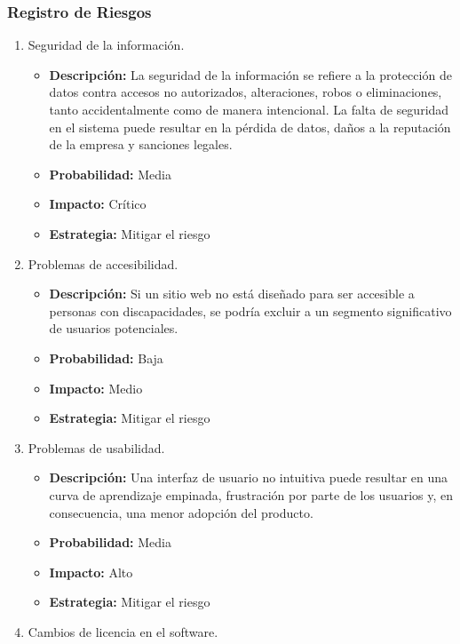 \subsubsection{Registro de Riesgos}
\begin{enumerate}
    \item Seguridad de la información.
    \begin{itemize}
        \item \textbf{Descripción:} La seguridad de la información se refiere a la protección de datos contra accesos no autorizados, 
        alteraciones, robos o eliminaciones, tanto accidentalmente como de manera intencional. 
        La falta de seguridad en el sistema puede resultar en la pérdida de datos, daños a la reputación de la empresa y sanciones legales. 
        \item \textbf{Probabilidad:} Media
        \item \textbf{Impacto:} Crítico
        \item \textbf{Estrategia:} Mitigar el riesgo
    \end{itemize}
    \item Problemas de accesibilidad.
    \begin{itemize}
        \item \textbf{Descripción:} Si un sitio web no está diseñado para ser accesible a personas con discapacidades, 
        se podría excluir a un segmento significativo de usuarios potenciales.
        \item \textbf{Probabilidad:} Baja
        \item \textbf{Impacto:} Medio
        \item \textbf{Estrategia:} Mitigar el riesgo
    \end{itemize}
    \item Problemas de usabilidad.
    \begin{itemize}
        \item \textbf{Descripción:} Una interfaz de usuario no intuitiva puede resultar en una curva de aprendizaje empinada, 
        frustración por parte de los usuarios y, en consecuencia, una menor adopción del producto.
        \item \textbf{Probabilidad:} Media
        \item \textbf{Impacto:} Alto
        \item \textbf{Estrategia:} Mitigar el riesgo
    \end{itemize}
    \item Cambios de licencia en el software.

\end{enumerate}
